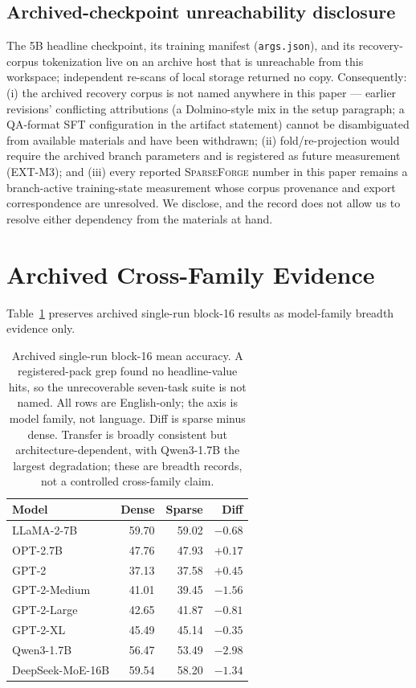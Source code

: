 \documentclass{article}
\newcommand{\method}{\textsc{SparseForge}}
\begin{document}
\subsection{Archived-checkpoint unreachability disclosure}
\label{app:r243closure}
The 5B headline checkpoint, its training manifest (\texttt{args.json}), and
its recovery-corpus tokenization live on an archive host that is unreachable
from this workspace;
independent re-scans of local storage returned no copy. Consequently: (i) the
archived recovery corpus is not named anywhere in this paper --- earlier
revisions' conflicting attributions (a Dolmino-style mix in the setup
paragraph; a QA-format SFT configuration in the artifact statement) cannot be
disambiguated from available materials and have been withdrawn; (ii)
fold/re-projection would require the archived branch parameters and is
registered as future measurement (EXT-M3); and (iii) every reported \method{}
number in this paper remains a branch-active training-state measurement whose
corpus provenance and export correspondence are unresolved. We disclose, and
the record does not allow us to resolve either dependency from the materials at
hand.

\section{Archived Cross-Family Evidence}
\label{app:archived}
Table~\ref{tab:archived} preserves archived single-run block-16 results as
model-family breadth evidence only.
\begin{table}[H]
\centering
\caption{Archived single-run block-16 mean accuracy. A registered-pack grep
found no headline-value hits, so the unrecoverable seven-task suite is not
named. All rows are English-only;
the axis is model family, not language. Diff is sparse minus dense. Transfer is
broadly consistent but architecture-dependent, with Qwen3-1.7B the largest
degradation; these are breadth records, not a controlled cross-family claim.}
\label{tab:archived}
\small
\begin{tabular}{lrrr}
\toprule
Model & Dense & Sparse & Diff \\
\midrule
LLaMA-2-7B & 59.70 & 59.02 & $-0.68$ \\
OPT-2.7B & 47.76 & 47.93 & $+0.17$ \\
GPT-2 & 37.13 & 37.58 & $+0.45$ \\
GPT-2-Medium & 41.01 & 39.45 & $-1.56$ \\
GPT-2-Large & 42.65 & 41.87 & $-0.81$ \\
GPT-2-XL & 45.49 & 45.14 & $-0.35$ \\
Qwen3-1.7B & 56.47 & 53.49 & $-2.98$ \\
DeepSeek-MoE-16B & 59.54 & 58.20 & $-1.34$ \\
\bottomrule
\end{tabular}
\end{table}
\end{document}
